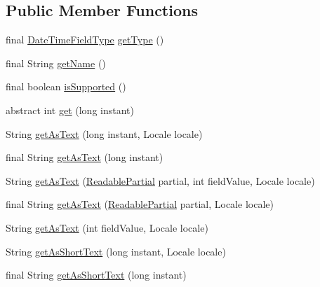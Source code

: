 \subsection*{Public Member Functions}
\begin{DoxyCompactItemize}
\item 
final \hyperlink{classorg_1_1joda_1_1time_1_1_date_time_field_type}{Date\-Time\-Field\-Type} \hyperlink{classorg_1_1joda_1_1time_1_1field_1_1_base_date_time_field_afb1ff64f28fdc040d7cc016033ad5535}{get\-Type} ()
\item 
final String \hyperlink{classorg_1_1joda_1_1time_1_1field_1_1_base_date_time_field_ad1f2fc619594ac4412979b933c7b8833}{get\-Name} ()
\item 
final boolean \hyperlink{classorg_1_1joda_1_1time_1_1field_1_1_base_date_time_field_aac687a061d13fde96731f5ac5d7aec50}{is\-Supported} ()
\item 
abstract int \hyperlink{classorg_1_1joda_1_1time_1_1field_1_1_base_date_time_field_abf5b59083b265cd3031cc5e6fed8419e}{get} (long instant)
\item 
String \hyperlink{classorg_1_1joda_1_1time_1_1field_1_1_base_date_time_field_a1322fa3904898aaa90bcf2e3f7d047b3}{get\-As\-Text} (long instant, Locale locale)
\item 
final String \hyperlink{classorg_1_1joda_1_1time_1_1field_1_1_base_date_time_field_ab895ad2287b5c24053adc72b5653960a}{get\-As\-Text} (long instant)
\item 
String \hyperlink{classorg_1_1joda_1_1time_1_1field_1_1_base_date_time_field_afa1fa1203b1ee42a3a817eb9736993c4}{get\-As\-Text} (\hyperlink{interfaceorg_1_1joda_1_1time_1_1_readable_partial}{Readable\-Partial} partial, int field\-Value, Locale locale)
\item 
final String \hyperlink{classorg_1_1joda_1_1time_1_1field_1_1_base_date_time_field_a0b53985c8b2f5e43dda73bf580d81f3b}{get\-As\-Text} (\hyperlink{interfaceorg_1_1joda_1_1time_1_1_readable_partial}{Readable\-Partial} partial, Locale locale)
\item 
String \hyperlink{classorg_1_1joda_1_1time_1_1field_1_1_base_date_time_field_aa74793c508b33c4bdb54cc12a14e1ae7}{get\-As\-Text} (int field\-Value, Locale locale)
\item 
String \hyperlink{classorg_1_1joda_1_1time_1_1field_1_1_base_date_time_field_af10ddf5408dd5303bd480267b28b54a8}{get\-As\-Short\-Text} (long instant, Locale locale)
\item 
final String \hyperlink{classorg_1_1joda_1_1time_1_1field_1_1_base_date_time_field_a1646e0b02f8de567488bd91a28d3c032}{get\-As\-Short\-Text} (long instant)

\end{DoxyCompactItemize}
